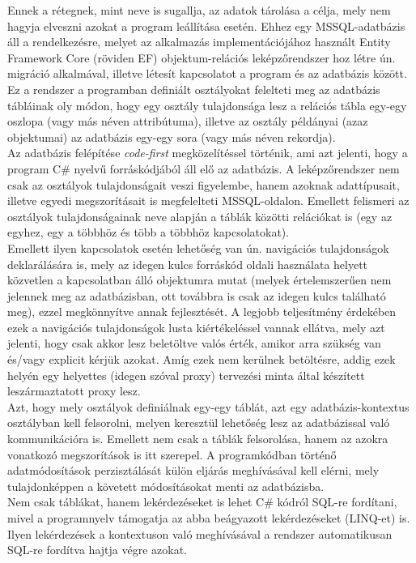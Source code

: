 Ennek a rétegnek, mint neve is sugallja, az adatok tárolása a célja, mely nem hagyja elveszni azokat a program leállítása esetén. Ehhez egy MSSQL-adatbázis áll a rendelkezésre, melyet az alkalmazás implementációjához használt Entity Framework Core (röviden EF) objektum-relációs leképzőrendszer hoz létre ún. migráció alkalmával, illetve létesít kapcsolatot a program és az adatbázis között. Ez a rendszer a programban definiált osztályokat felelteti meg az adatbázis tábláinak oly módon, hogy egy osztály tulajdonsága lesz a relációs tábla egy-egy oszlopa (vagy más néven attribútuma), illetve az osztály példányai (azaz objektumai) az adatbázis egy-egy sora (vagy más néven rekordja). \\
Az adatbázis felépítése \textit{code-first} megközelítéssel történik, ami azt jelenti, hogy a program C\# nyelvű forráskódjából áll elő az adatbázis. A leképzőrendszer nem csak az osztályok tulajdonságait veszi figyelembe, hanem azoknak adattípusait, illetve egyedi megszorításait is megfelelteti MSSQL-oldalon. Emellett felismeri az osztályok tulajdonságainak neve alapján a táblák közötti relációkat is (egy az egyhez, egy a többhöz és több a többhöz kapcsolatokat).\\
Emellett ilyen kapcsolatok esetén lehetőség van ún. navigációs tulajdonságok deklarálására is, mely az idegen kulcs forráskód oldali használata helyett közvetlen a kapcsolatban álló objektumra mutat (melyek értelemszerűen nem jelennek meg az adatbázisban, ott továbbra is csak az idegen kulcs található meg), ezzel megkönnyítve annak fejlesztését. A legjobb teljesítmény érdekében ezek a navigációs tulajdonságok lusta kiértékeléssel vannak ellátva, mely azt jelenti, hogy csak akkor lesz beletöltve valós érték, amikor arra szükség van és/vagy explicit kérjük azokat. Amíg ezek nem kerülnek betöltésre, addig ezek helyén egy helyettes (idegen szóval proxy) tervezési minta által készített leszármaztatott proxy lesz.\\
Azt, hogy mely osztályok definiálnak egy-egy táblát, azt egy adatbázis-kontextus osztályban kell felsorolni, melyen keresztül lehetőség lesz az adatbázissal való kommunikációra is. Emellett nem csak a táblák felsorolása, hanem az azokra vonatkozó megszorítások is itt szerepel. A programkódban történő adatmódosítások perzisztálását külön eljárás meghívásával kell elérni, mely tulajdonképpen a követett módosításokat menti az adatbázisba.\\
Nem csak táblákat, hanem lekérdezéseket is lehet C\# kódról SQL-re fordítani, mivel a programnyelv támogatja az abba beágyazott lekérdezéseket (LINQ-et) is. Ilyen lekérdezések a kontextuson való meghívásával a rendszer automatikusan SQL-re fordítva hajtja végre azokat. \cite{ef-behavior}

